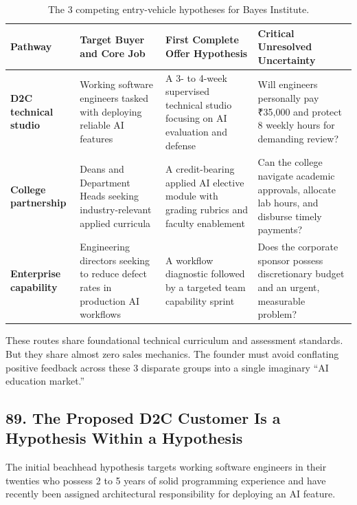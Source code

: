 \begin{table}[t]
\centering
\small
\begin{tabularx}{\textwidth}{>{\raggedright\arraybackslash}p{3.2cm} >{\raggedright\arraybackslash}p{4cm} >{\raggedright\arraybackslash}X >{\raggedright\arraybackslash}X}
\toprule
\textbf{Pathway} & \textbf{Target Buyer and Core Job} & \textbf{First Complete Offer Hypothesis} & \textbf{Critical Unresolved Uncertainty} \\
\midrule
\textbf{D2C technical studio} & Working software engineers tasked with deploying reliable AI features & A 3- to 4-week supervised technical studio focusing on AI evaluation and defense & Will engineers personally pay ₹35,000 and protect 8 weekly hours for demanding review? \\
\textbf{College partnership} & Deans and Department Heads seeking industry-relevant applied curricula & A credit-bearing applied AI elective module with grading rubrics and faculty enablement & Can the college navigate academic approvals, allocate lab hours, and disburse timely payments? \\
\textbf{Enterprise capability} & Engineering directors seeking to reduce defect rates in production AI workflows & A workflow diagnostic followed by a targeted team capability sprint & Does the corporate sponsor possess discretionary budget and an urgent, measurable problem? \\
\bottomrule
\end{tabularx}
\caption{The 3 competing entry-vehicle hypotheses for Bayes Institute.}
\label{tab:ch9-bayes-routes}
\end{table}

These routes share foundational technical curriculum and assessment standards. But they share almost zero sales mechanics. The founder must avoid conflating positive feedback across these 3 disparate groups into a single imaginary ``AI education market.''

\subsection*{89. The Proposed D2C Customer Is a Hypothesis Within a Hypothesis}

The initial beachhead hypothesis targets working software engineers in their twenties who possess 2 to 5 years of solid programming experience and have recently been assigned architectural responsibility for deploying an AI feature.

